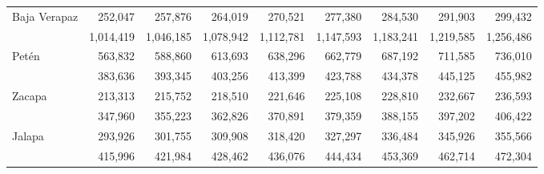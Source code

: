 {\begin{center}
\begin{tabular}{lrrrrrrrr}
			\multicolumn{1}{l}{Baja Verapaz}	&	 252,047 	&	 257,876 	&	 264,019 	&	 270,521 	&	 277,380 	&	 284,530 	&	 291,903 	&	 299,432 	\\
			\rowcolor{color1!10!white} \multicolumn{1}{l}{Alta Verapaz}	&	 1,014,419 	&	 1,046,185 	&	 1,078,942 	&	 1,112,781 	&	 1,147,593 	&	 1,183,241 	&	 1,219,585 	&	 1,256,486 	\\
			\multicolumn{1}{l}{Petén}	&	 563,832 	&	 588,860 	&	 613,693 	&	 638,296 	&	 662,779 	&	 687,192 	&	 711,585 	&	 736,010 	\\
			\rowcolor{color1!10!white} \multicolumn{1}{l}{Izabal}	&	 383,636 	&	 393,345 	&	 403,256 	&	 413,399 	&	 423,788 	&	 434,378 	&	 445,125 	&	 455,982 	\\
			\multicolumn{1}{l}{Zacapa}	&	 213,313 	&	 215,752 	&	 218,510 	&	 221,646 	&	 225,108 	&	 228,810 	&	 232,667 	&	 236,593 	\\
			\rowcolor{color1!10!white} \multicolumn{1}{l}{Chiquimula}	&	 347,960 	&	 355,223 	&	 362,826 	&	 370,891 	&	 379,359 	&	 388,155 	&	 397,202 	&	 406,422 	\\
			\multicolumn{1}{l}{Jalapa}	&	 293,926 	&	 301,755 	&	 309,908 	&	 318,420 	&	 327,297 	&	 336,484 	&	 345,926 	&	 355,566 	\\
			\rowcolor{color1!10!white} \multicolumn{1}{l}{Jutiapa}	&	 415,996 	&	 421,984 	&	 428,462 	&	 436,076 	&	 444,434 	&	 453,369 	&	 462,714 	&	 472,304 	\\

\end{tabular}
\end{center}}
